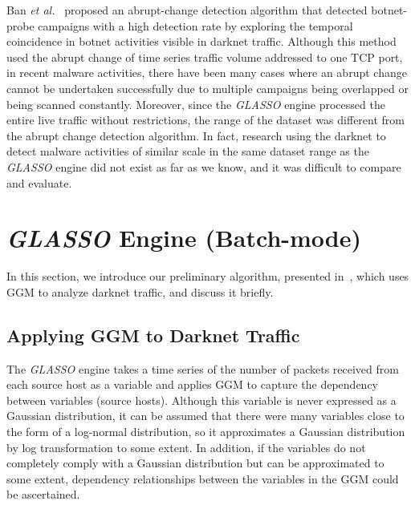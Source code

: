 \documentclass[conference]{IEEEtran}
\begin{document}
Ban {\it et al.}~\cite{Ban} proposed an abrupt-change detection algorithm that detected botnet-probe campaigns with a high detection rate by exploring the temporal coincidence in botnet activities visible in darknet traffic.
Although this method used the abrupt change of time series traffic volume addressed to one TCP port, in recent malware activities, there have been many cases where an abrupt change cannot be undertaken successfully due to multiple campaigns being overlapped or being scanned constantly.
Moreover, since the {\it GLASSO} engine processed the entire live traffic without restrictions, the range of the dataset was different from the abrupt change detection algorithm.
In fact, research using the darknet to detect malware activities of similar scale in the same dataset range as the {\it GLASSO} engine did not exist as far as we know, and it was difficult to compare and evaluate.




\section{{\it GLASSO} Engine (Batch-mode)}
In this section, we introduce our preliminary algorithm, presented in~\cite{Han}, which uses GGM to analyze darknet traffic, and discuss it briefly.


\subsection{Applying GGM to Darknet Traffic}
The {\it GLASSO} engine takes a time series of the number of packets received from each source host as a variable and applies GGM to capture the dependency between variables (source hosts).
Although this variable is never expressed as a Gaussian distribution, it can be assumed that there were many variables close to the form of a log-normal distribution, so it approximates a Gaussian distribution by log transformation to some extent.
In addition, if the variables do not completely comply with a Gaussian distribution but can be approximated to some extent, dependency relationships between the variables in the GGM could be ascertained.
\end{document}
